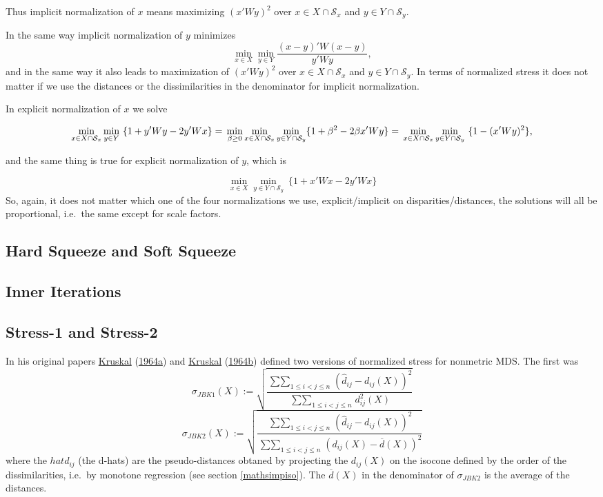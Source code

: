 \documentclass[
  12pt,
]{book}
\theoremstyle{definition}
\theoremstyle{definition}
\theoremstyle{definition}
\theoremstyle{definition}
\theoremstyle{remark}
\begin{document}
Thus implicit normalization of \(x\) means maximizing \((x'Wy)^2\) over
\(x\in X\cap\mathcal{S}_x\) and \(y\in Y\cap\mathcal{S}_y.\)

In the same way implicit normalization of \(y\) minimizes \[
\min_{x\in X}\min_{y\in Y}\frac{(x-y)'W(x-y)}{y'Wy},
\] and in the same way it also leads to maximization of \((x'Wy)^2\) over
\(x\in X\cap\mathcal{S}_x\) and \(y\in Y\cap\mathcal{S}_y.\) In terms of
normalized stress it does not matter if we use the distances or the
dissimilarities in the denominator for implicit normalization.

In explicit normalization of \(x\) we solve

\[
\min_{x\in X\cap\mathcal{S}_x}\min_{y\in Y}\ \{1+y'Wy-2y'Wx\}=\\
\min_{\beta\geq 0}\min_{x\in X\cap\mathcal{S}_x}\min_{y\in Y\cap\mathcal{S}_y}\{1+\beta^2-2\beta x'Wy\}
=\\\min_{x\in X\cap\mathcal{S}_x}\min_{y\in Y\cap\mathcal{S}_y}\ \{1-(x'Wy)^2\},
\]

and the same thing is true for explicit normalization of \(y\), which
is

\[
\min_{x\in X}\min_{y\in Y\cap\mathcal{S}_y}\ \{1+x'Wx-2y'Wx\}
\]
So, again, it does not matter which one of the four normalizations we
use, explicit/implicit on disparities/distances, the solutions will all
be proportional, i.e.~the same except for scale factors.

\hypertarget{hard-squeeze-and-soft-squeeze}{%
\subsection{Hard Squeeze and Soft Squeeze}\label{hard-squeeze-and-soft-squeeze}}

\hypertarget{inner-iterations}{%
\subsection{Inner Iterations}\label{inner-iterations}}

\hypertarget{stress-1-and-stress-2}{%
\subsection{Stress-1 and Stress-2}\label{stress-1-and-stress-2}}

In his original papers \protect\hyperlink{ref-kruskal_64a}{Kruskal} (\protect\hyperlink{ref-kruskal_64a}{1964a}) and \protect\hyperlink{ref-kruskal_64b}{Kruskal} (\protect\hyperlink{ref-kruskal_64b}{1964b}) defined two
versions of normalized stress for nonmetric MDS. The first was
\[
\sigma_{JBK1}(X):=\sqrt{\frac{\mathop{\sum\sum}_{1\leq i<j\leq n}(\hat d_{ij}-d_{ij}(X))^2}{\mathop{\sum\sum}_{1\leq i<j\leq n}d_{ij}^2(X)}}
\]
\[
\sigma_{JBK2}(X):=\sqrt{\frac{\mathop{\sum\sum}_{1\leq i<j\leq n}(\hat d_{ij}-d_{ij}(X))^2}{\mathop{\sum\sum}_{1\leq i<j\leq n}(d_{ij}(X)-\overline{d}(X))^2}}
\]
where the \(hat d_{ij}\) (the d-hats) are the pseudo-distances obtaned
by projecting the \(d_{ij}(X)\) on the isocone defined by the order of the
dissimilarities, i.e.~by monotone regression (see section
\ref{mathsimpiso}). The \(\overline{d}(X)\) in the denominator of
\(\sigma_{JBK2}\) is the average of the distances.
\end{document}
